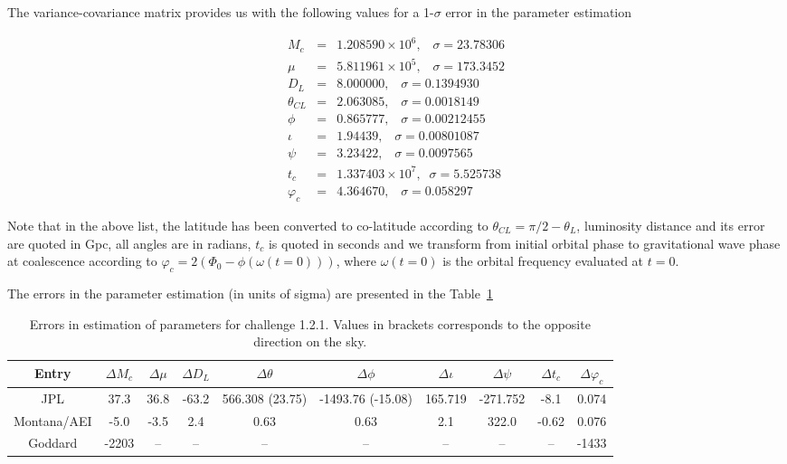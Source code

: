 \documentclass[11pt]{article}
\def\bea{\begin{eqnarray}}
\def\ena{\end{eqnarray}}
\begin{document}
The variance-covariance matrix provides us with the following values for a 1-$\sigma$ error in the parameter estimation

\bea
M_c &=& 1.208590\times 10^6,\;\;\;     \sigma = 23.78306\\
\mu &=& 5.811961\times 10^5,\;\;\;     \sigma = 173.3452\\
D_{L} &=& 8.000000,\;\;\;     \sigma = 0.1394930\\
\theta_{CL} &=& 2.063085, \;\;\;   \sigma = 0.0018149\\
\phi &=& 0.865777 , \;\;\;      \sigma = 0.00212455\\
\iota &=& 1.94439 , \;\;\;       \sigma = 0.00801087\\
\psi &=& 3.23422, \;\;\;        \sigma = 0.0097565\\
t_{c} &=& 1.337403\times 10^7,\;\;    \sigma = 5.525738\\
\varphi_{c} &=& 4.364670, \;\;\;      \sigma = 0.058297
\ena

Note that in the above list,  the latitude has been converted to co-latitude according to $\theta_{CL}=\pi/2 - \theta_{L}$, luminosity distance and its error are quoted in Gpc, all angles are in radians, $t_{c}$ is quoted in seconds and we transform from initial orbital phase to gravitational wave phase at coalescence according to $\varphi_{c} = 2\left(\Phi_{0}-\phi(\omega(t=0))\right)$, where $\omega(t=0)$ is the orbital frequency evaluated at $t=0$.  

The errors in the parameter estimation (in units of sigma) are presented in the Table~\ref{Errors1.2.1}
\begin{table}
\caption{\label{Errors1.2.1} Errors in estimation of parameters for challenge 1.2.1. Values in brackets corresponds to the 
opposite direction on the sky.}
\begin{center}
\begin{tabular}{|c|c|c|c|c|c|c|c|c|c|}
\hline
Entry & $\Delta M_c$ & $\Delta \mu $ & $\Delta D_{L}$ & $\Delta \theta $ & $\Delta \phi $ & $\Delta \iota $ &
$\Delta \psi $ & $\Delta t_c $& $\Delta \varphi_c $ \\ 
\hline
 JPL & 37.3& 36.8 &-63.2 & 566.308 (23.75)& -1493.76  (-15.08) & 165.719 & -271.752 & -8.1 &
0.074\\
Montana/AEI & -5.0 & -3.5 & 2.4  & 0.63 & 0.63 & 2.1 & 322.0 & -0.62 &  0.076 \\
Goddard & -2203 & -- & --  & --& -- & -- & -- & -- & -1433 \\
\hline
\end{tabular}
\end{center}
\end{table}
\end{document}
